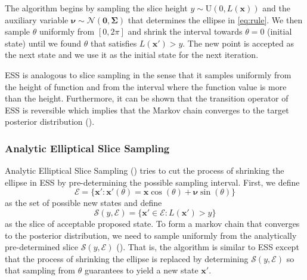 \documentclass{scrartcl}
\numberwithin{equation}{section}
\begin{document}
The algorithm begins by sampling the slice height $y \sim \text{U}(0, L(\textbf{x}))$ and the auxiliary variable $\boldsymbol{\nu} \sim \mathcal{N}(\textbf{0}, \boldsymbol{\Sigma})$ that determines the ellipse in \eqref{eq:rule}. We then sample $\theta$ uniformly from $[0, 2\pi]$ and shrink the interval towards $\theta=0$ (initial state) until we found $\theta$ that satisfies $L(\textbf{x}') > y$. The new point is accepted as the next state and we use it as the initial state for the next iteration.   

ESS is analogous to slice sampling in the sense that it samples uniformly from the height of function and from the interval where the function value is more than the height. Furthermore, it can be shown that the transition operator of ESS is reversible which implies that the Markov chain converges to the target posterior distribution (\cite{murray2010}).   

\subsubsection{Analytic Elliptical Slice Sampling}
Analytic Elliptical Slice Sampling (\cite{Fagan2016ESSwEP}) tries to cut the process of shrinking the ellipse in ESS by pre-determining the possible sampling interval. First, we define
\begin{equation}\label{eq:ellipse}
	\mathcal{E} = \{\textbf{x}':\textbf{x}'(\theta) = \textbf{x}\cos(\theta) + \boldsymbol{\nu}\sin(\theta)\}
\end{equation} 
as the set of possible new states and define
\begin{equation}\label{eq:slice}
	\mathcal{S}(y,\mathcal{E}) = \{ \textbf{x}'\in \mathcal{E}: L(\textbf{x}')>y\}
\end{equation}
as the slice of acceptable proposed state. To form a markov chain that converges to the posterior distribution, we need to sample uniformly from the analytically pre-determined slice $\mathcal{S}(y,\mathcal{E})$ (\cite{Fagan2016ESSwEP}). That is, the algorithm is similar to ESS except that the process of shrinking the ellipse is replaced by determining $\mathcal{S}(y,\mathcal{E})$ so that sampling from $\theta$ guarantees to yield a new state $\textbf{x}'$.    
\end{document}
